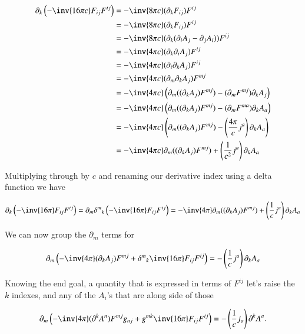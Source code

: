 \begin{align*}
\partial_k \left( -\inv{16 \pi c} F_{i j} F^{i j} \right) 
&= -\inv{8 \pi c} (\partial_k F_{i j} )F^{i j} \\
&= -\inv{8 \pi c} (\partial_k F_{i j} )F^{i j} \\
&= -\inv{8 \pi c} (\partial_k (\partial_i A_j - \partial_j A_i) )F^{i j} \\
&= -\inv{4 \pi c} (\partial_k \partial_i A_j )F^{i j} \\
&= -\inv{4 \pi c} (\partial_i \partial_k A_j )F^{i j} \\
&= -\inv{4 \pi c} (\partial_m \partial_k A_j )F^{m j} \\
&= -\inv{4 \pi c} \left( \partial_m ((\partial_k A_j )F^{m j}) - (\partial_m F^{m j}) \partial_k A_j \right) \\
&= -\inv{4 \pi c} \left( \partial_m ((\partial_k A_j )F^{m j}) - (\partial_m F^{m a}) \partial_k A_a \right) \\
&= -\inv{4 \pi c} \left( \partial_m ((\partial_k A_j )F^{m j}) - \left(\frac{4 \pi}{c} j^a \right) \partial_k A_a \right) \\
&= -\inv{4 \pi c} \partial_m ((\partial_k A_j )F^{m j}) + \left(\frac{1}{c^2} j^a \right) \partial_k A_a 
\end{align*}

Multiplying through by $c$ and renaming our derivative index using a delta function we have

\begin{equation}\label{eqn:relativisticElectrodynamicsL22:10}
\partial_k \left( -\inv{16 \pi } F_{i j} F^{i j} \right) =
\partial_m {\delta^{m}}_k \left( -\inv{16 \pi } F_{i j} F^{i j} \right) 
= -\inv{4 \pi } \partial_m ((\partial_k A_j )F^{m j}) + \left(\frac{1}{c} j^a \right) \partial_k A_a 
\end{equation}

We can now group the $\partial_m$ terms for

\begin{equation}\label{eqn:relativisticElectrodynamicsL22:30}
\partial_m \left(
-\inv{4 \pi } (\partial_k A_j )F^{m j}
+ {\delta^{m}}_k \inv{16 \pi } F_{i j} F^{i j} 
\right)
= 
- \left(\frac{1}{c} j^a \right) \partial_k A_a 
\end{equation}

Knowing the end goal, a quantity that is expressed in terms of $F^{ij}$ let's raise the $k$ indexes, and any of the $A_i$'s that are along side of those

\begin{equation}\label{eqn:relativisticElectrodynamicsL22:50}
\partial_m \left(
-\inv{4 \pi } (\partial^k A^n )F^{m j} g_{n j}
+ g^{m k} \inv{16 \pi } F_{i j} F^{i j} 
\right)
= 
- \left(\frac{1}{c} j_a \right) \partial^k A^a.
\end{equation}

